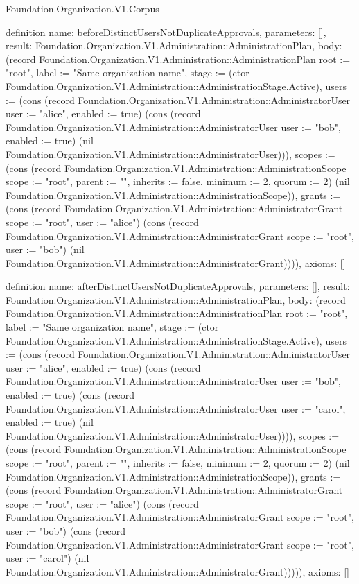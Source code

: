 \begin{lexlean}{Foundation.Organization.V1.Corpus}
\begin{semanticmodule}
definition{
  name: beforeDistinctUsersNotDuplicateApprovals,
  parameters: [],
  result: Foundation.Organization.V1.Administration::AdministrationPlan,
  body: (record Foundation.Organization.V1.Administration::AdministrationPlan {root := "root", label := "Same organization name", stage := (ctor Foundation.Organization.V1.Administration::AdministrationStage.Active), users := (cons (record Foundation.Organization.V1.Administration::AdministratorUser {user := "alice", enabled := true}) (cons (record Foundation.Organization.V1.Administration::AdministratorUser {user := "bob", enabled := true}) (nil Foundation.Organization.V1.Administration::AdministratorUser))), scopes := (cons (record Foundation.Organization.V1.Administration::AdministrationScope {scope := "root", parent := "", inherits := false, minimum := 2, quorum := 2}) (nil Foundation.Organization.V1.Administration::AdministrationScope)), grants := (cons (record Foundation.Organization.V1.Administration::AdministratorGrant {scope := "root", user := "alice"}) (cons (record Foundation.Organization.V1.Administration::AdministratorGrant {scope := "root", user := "bob"}) (nil Foundation.Organization.V1.Administration::AdministratorGrant)))}),
  axioms: []
}

definition{
  name: afterDistinctUsersNotDuplicateApprovals,
  parameters: [],
  result: Foundation.Organization.V1.Administration::AdministrationPlan,
  body: (record Foundation.Organization.V1.Administration::AdministrationPlan {root := "root", label := "Same organization name", stage := (ctor Foundation.Organization.V1.Administration::AdministrationStage.Active), users := (cons (record Foundation.Organization.V1.Administration::AdministratorUser {user := "alice", enabled := true}) (cons (record Foundation.Organization.V1.Administration::AdministratorUser {user := "bob", enabled := true}) (cons (record Foundation.Organization.V1.Administration::AdministratorUser {user := "carol", enabled := true}) (nil Foundation.Organization.V1.Administration::AdministratorUser)))), scopes := (cons (record Foundation.Organization.V1.Administration::AdministrationScope {scope := "root", parent := "", inherits := false, minimum := 2, quorum := 2}) (nil Foundation.Organization.V1.Administration::AdministrationScope)), grants := (cons (record Foundation.Organization.V1.Administration::AdministratorGrant {scope := "root", user := "alice"}) (cons (record Foundation.Organization.V1.Administration::AdministratorGrant {scope := "root", user := "bob"}) (cons (record Foundation.Organization.V1.Administration::AdministratorGrant {scope := "root", user := "carol"}) (nil Foundation.Organization.V1.Administration::AdministratorGrant))))}),
  axioms: []
}


\end{semanticmodule}
\end{lexlean}
